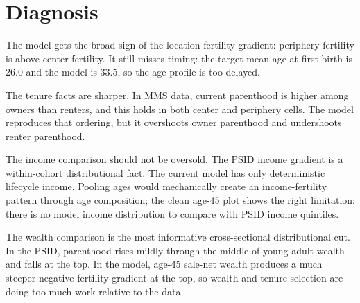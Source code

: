 \documentclass[11pt]{article}
\begin{document}
\section*{Diagnosis}

\noindent The model gets the broad sign of the location fertility gradient: periphery fertility is above center fertility. It still misses timing: the target mean age at first birth is 26.0 and the model is 33.5, so the age profile is too delayed.

\medskip
\noindent The tenure facts are sharper. In MMS data, current parenthood is higher among owners than renters, and this holds in both center and periphery cells. The model reproduces that ordering, but it overshoots owner parenthood and undershoots renter parenthood.

\medskip
\noindent The income comparison should not be oversold. The PSID income gradient is a within-cohort distributional fact. The current model has only deterministic lifecycle income. Pooling ages would mechanically create an income-fertility pattern through age composition; the clean age-45 plot shows the right limitation: there is no model income distribution to compare with PSID income quintiles.

\medskip
\noindent The wealth comparison is the most informative cross-sectional distributional cut. In the PSID, parenthood rises mildly through the middle of young-adult wealth and falls at the top. In the model, age-45 sale-net wealth produces a much steeper negative fertility gradient at the top, so wealth and tenure selection are doing too much work relative to the data.
\end{document}
